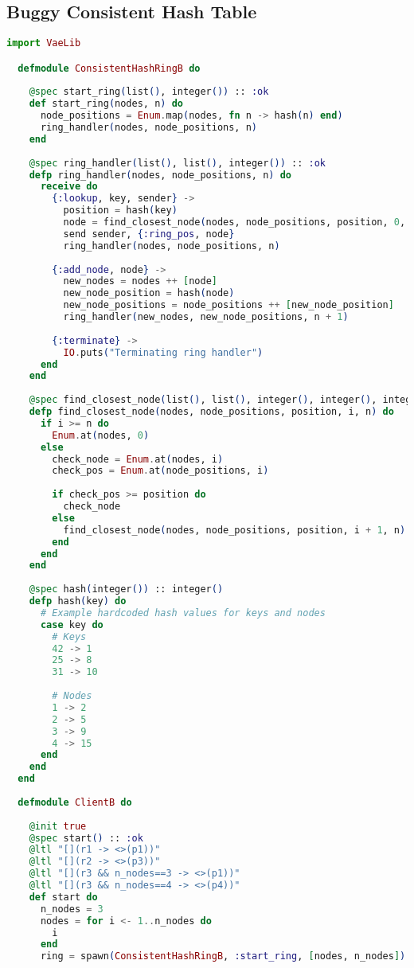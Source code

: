 \subsection{Buggy Consistent Hash Table}
\begin{lstlisting}[language=Elixir, xleftmargin=.1\linewidth]
  import VaeLib

  defmodule ConsistentHashRingB do
  
    @spec start_ring(list(), integer()) :: :ok
    def start_ring(nodes, n) do
      node_positions = Enum.map(nodes, fn n -> hash(n) end)
      ring_handler(nodes, node_positions, n)
    end
  
    @spec ring_handler(list(), list(), integer()) :: :ok
    defp ring_handler(nodes, node_positions, n) do
      receive do
        {:lookup, key, sender} ->
          position = hash(key)
          node = find_closest_node(nodes, node_positions, position, 0, n)
          send sender, {:ring_pos, node}
          ring_handler(nodes, node_positions, n)
  
        {:add_node, node} ->
          new_nodes = nodes ++ [node]
          new_node_position = hash(node)
          new_node_positions = node_positions ++ [new_node_position]
          ring_handler(new_nodes, new_node_positions, n + 1)
  
        {:terminate} ->
          IO.puts("Terminating ring handler")
      end
    end
  
    @spec find_closest_node(list(), list(), integer(), integer(), integer()) :: integer()
    defp find_closest_node(nodes, node_positions, position, i, n) do
      if i >= n do
        Enum.at(nodes, 0)
      else
        check_node = Enum.at(nodes, i)
        check_pos = Enum.at(node_positions, i)
  
        if check_pos >= position do
          check_node
        else
          find_closest_node(nodes, node_positions, position, i + 1, n)
        end
      end
    end
  
    @spec hash(integer()) :: integer()
    defp hash(key) do
      # Example hardcoded hash values for keys and nodes
      case key do
        # Keys
        42 -> 1
        25 -> 8
        31 -> 10
  
        # Nodes
        1 -> 2
        2 -> 5
        3 -> 9
        4 -> 15
      end
    end
  end
  
  defmodule ClientB do
  
    @init true
    @spec start() :: :ok
    @ltl "[](r1 -> <>(p1))"
    @ltl "[](r2 -> <>(p3))"
    @ltl "[](r3 && n_nodes==3 -> <>(p1))"
    @ltl "[](r3 && n_nodes==4 -> <>(p4))"
    def start do
      n_nodes = 3
      nodes = for i <- 1..n_nodes do
        i
      end
      ring = spawn(ConsistentHashRingB, :start_ring, [nodes, n_nodes])
  

\end{lstlisting}
